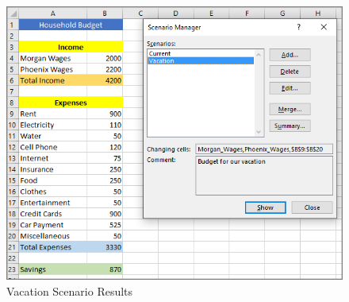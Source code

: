\begin{figure}[H]
	\centering
	\includegraphics[width=\maxwidth{.95\linewidth}]{gfx/ch08_fig56}
	\caption{Vacation Scenario Results}
	\label{08:fig56}
\end{figure}

